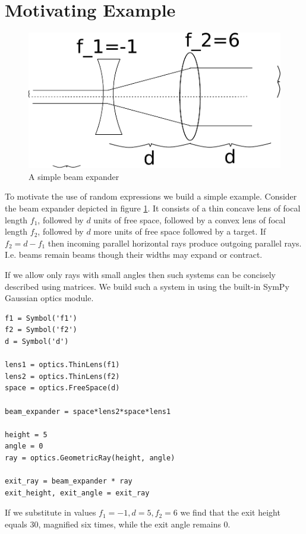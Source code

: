 \section{Motivating Example}
\label{sec:optics}

\begin{figure}
\vspace{-20pt}
\centering
\includegraphics[width=.5\textwidth]{images/beam_expander}
\vspace{-0pt}
\caption{A simple beam expander}
\label{fig:beam_expander}
\vspace{-10pt}
\end{figure}

To motivate the use of random expressions we build a simple example. Consider the beam expander depicted in figure \ref{fig:beam_expander}. It consists of a thin concave lens of focal length $f_1$, followed by $d$ units of free space, followed by a convex lens of focal length $f_2$, followed by $d$ more units of free space followed by a target. If $f_2 = d-f_1$ then incoming parallel horizontal rays produce outgoing parallel rays. I.e. beams remain beams though their widths may
expand or contract.

If we allow only rays with small angles then such systems can be concisely described using matrices. We build such a system in using the built-in SymPy Gaussian optics module. 

\begin{lstlisting} 
f1 = Symbol('f1')
f2 = Symbol('f2')
d = Symbol('d')

lens1 = optics.ThinLens(f1)
lens2 = optics.ThinLens(f2)
space = optics.FreeSpace(d)

beam_expander = space*lens2*space*lens1

height = 5
angle = 0
ray = optics.GeometricRay(height, angle)

exit_ray = beam_expander * ray
exit_height, exit_angle = exit_ray

\end{lstlisting} 

If we substitute in values $f_1 = -1 , d=5 , f_2=6$ we find that the exit height equals 30, magnified six times, while the exit angle remains 0. 

